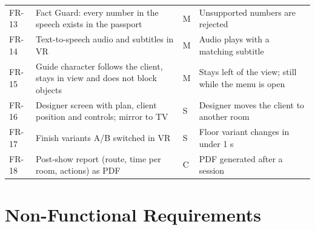 {\begin{tightblock}
\begin{longtable}{P{1.1cm} P{6.3cm} P{0.9cm} P{4.6cm}}
FR-13 & Fact Guard: every number in the speech exists in the passport & M & Unsupported numbers are rejected \\
FR-14 & Text-to-speech audio and subtitles in VR & M & Audio plays with a matching subtitle \\
FR-15 & Guide character follows the client, stays in view and does not block objects & M & Stays left of the view; still while the menu is open \\
FR-16 & Designer screen with plan, client position and controls; mirror to TV & S & Designer moves the client to another room \\
FR-17 & Finish variants A/B switched in VR & S & Floor variant changes in under 1 s \\
FR-18 & Post-show report (route, time per room, actions) as PDF & C & PDF generated after a session \\
\bottomrule
\end{longtable}
\end{tightblock}}

\section{Non-Functional Requirements}

